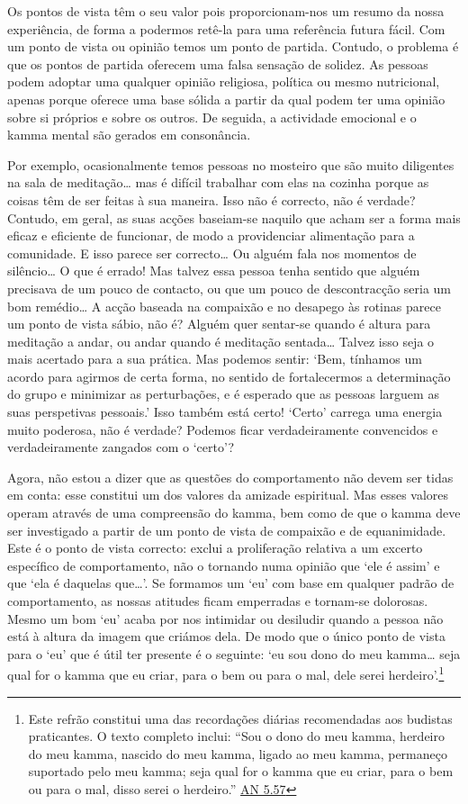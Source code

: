 Os pontos de vista têm o seu valor pois proporcionam-nos um resumo da nossa experiência, de forma a podermos retê-la para uma referência futura fácil. Com um ponto de vista ou opinião temos um ponto de partida. Contudo, o problema é que os pontos de partida oferecem uma falsa sensação de solidez. As pessoas podem adoptar uma qualquer opinião religiosa, política ou mesmo nutricional, apenas porque oferece uma base sólida a partir da qual podem ter uma opinião sobre si próprios e sobre os outros. De seguida, a actividade emocional e o kamma mental são gerados em consonância.

Por exemplo, ocasionalmente temos pessoas no mosteiro que são muito diligentes na sala de meditação\ldots{} mas é difícil trabalhar com elas na cozinha porque as coisas têm de ser feitas à sua maneira. Isso não é correcto, não é verdade? Contudo, em geral, as suas acções baseiam-se naquilo que acham ser a forma mais eficaz e eficiente de funcionar, de modo a providenciar alimentação para a comunidade. E isso parece ser correcto\ldots{} Ou alguém fala nos momentos de silêncio\ldots{} O que é errado! Mas talvez essa pessoa tenha sentido que alguém precisava de um pouco de contacto, ou que um pouco de descontracção seria um bom remédio\ldots{} A acção baseada na compaixão e no desapego às rotinas parece um ponto de vista sábio, não é? Alguém quer sentar-se quando é altura para meditação a andar, ou andar quando é meditação sentada\ldots{} Talvez isso seja o mais acertado para a sua prática. Mas podemos sentir: `Bem, tínhamos um acordo para agirmos de certa forma, no sentido de fortalecermos a determinação do grupo e minimizar as perturbações, e é esperado que as pessoas larguem as suas perspetivas pessoais.' Isso também está certo! `Certo' carrega uma energia muito poderosa, não é verdade? Podemos ficar verdadeiramente convencidos e verdadeiramente zangados com o `certo'?

Agora, não estou a dizer que as questões do comportamento não devem ser tidas em conta: esse constitui um dos valores da amizade espiritual. Mas esses valores operam através de uma compreensão do kamma, bem como de que o kamma deve ser investigado a partir de um ponto de vista de compaixão e de equanimidade. Este é o ponto de vista correcto: exclui a proliferação relativa a um excerto específico de comportamento, não o tornando numa opinião que `ele é assim' e que `ela é daquelas que\ldots{}'. Se formamos um `eu' com base em qualquer padrão de comportamento, as nossas atitudes ficam emperradas e tornam-se dolorosas. Mesmo um bom `eu' acaba por nos intimidar ou desiludir quando a pessoa não está à altura da imagem que criámos dela. De modo que o único ponto de vista para o `eu' que é útil ter presente é o seguinte: `eu sou dono do meu kamma\ldots{} seja qual for o kamma que eu criar, para o bem ou para o mal, dele serei herdeiro'.\footnote{Este refrão constitui uma das recordações diárias recomendadas aos budistas praticantes. O texto completo inclui: ``Sou o dono do meu kamma, herdeiro do meu kamma, nascido do meu kamma, ligado ao meu kamma, permaneço suportado pelo meu kamma; seja qual for o kamma que eu criar, para o bem ou para o mal, disso serei o herdeiro.'' \href{https://suttacentral.net/an5.57/en/bodhi}{AN 5.57}}

